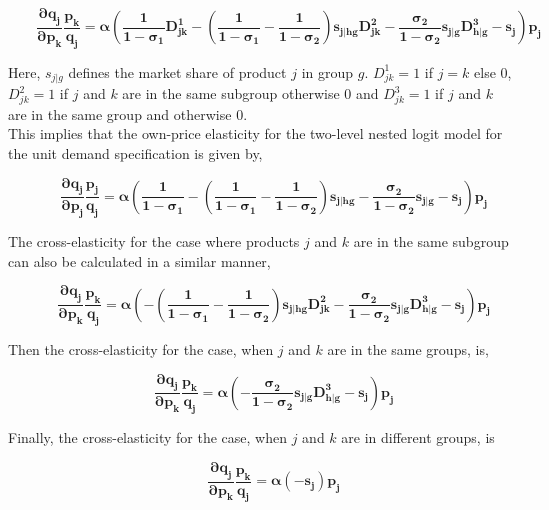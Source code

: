 \documentclass[a4paper,11pt]{article}
\begin{document}
    \begin{equation*}
        \qquad \mathbf{\dfrac{\partial q_{j}}{\partial p_{k}} \dfrac{p_{k}}{q_{j}} = \alpha \left(\dfrac{1}{1-\sigma_{1}}D_{jk}^{1} - \left( \dfrac{1}{1-\sigma_{1}} - \dfrac{1}{1-\sigma_{2}}\right)s_{j|hg}D_{jk}^2 - \dfrac{\sigma_{2}}{1-\sigma_{2}}s_{j|g}D_{h|g}^{3} - s_{j} \right)p_{j}}
    \end{equation*}
    
    Here, $s_{j|g}$ defines the market share of product $j$ in group $g$. $D_{jk}^{1} = 1$ if $j=k$ else $0$, $D_{jk}^{2} = 1$ if $j$ and $k$ are in the same subgroup otherwise $0$ and $D_{jk}^{3} = 1$ if $j$ and $k$ are in the same group and otherwise $0$.\\

    This implies that the own-price elasticity for the two-level nested logit model for the unit demand specification is given by,

    \begin{equation*}
        \qquad \mathbf{\dfrac{\partial q_{j}}{\partial p_{j}} \dfrac{p_{j}}{q_{j}} = \alpha \left(\dfrac{1}{1-\sigma_{1}} - \left( \dfrac{1}{1-\sigma_{1}} - \dfrac{1}{1-\sigma_{2}}\right)s_{j|hg} - \dfrac{\sigma_{2}}{1-\sigma_{2}}s_{j|g} - s_{j} \right)p_{j}}
    \end{equation*}

    The cross-elasticity for the case where products $j$ and $k$ are in the same subgroup can also be calculated in a similar manner,

    \begin{equation*}
        \qquad \mathbf{\dfrac{\partial q_{j}}{\partial p_{k}} \dfrac{p_{k}}{q_{j}} = \alpha \left( - \left( \dfrac{1}{1-\sigma_{1}} - \dfrac{1}{1-\sigma_{2}}\right)s_{j|hg}D_{jk}^2 - \dfrac{\sigma_{2}}{1-\sigma_{2}}s_{j|g}D_{h|g}^{3} - s_{j} \right)p_{j}}
    \end{equation*}

    Then the cross-elasticity for the case, when $j$ and $k$ are in the same groups, is,

    \begin{equation*}
        \qquad \mathbf{\dfrac{\partial q_{j}}{\partial p_{k}} \dfrac{p_{k}}{q_{j}} = \alpha \left( - \dfrac{\sigma_{2}}{1-\sigma_{2}}s_{j|g}D_{h|g}^{3} - s_{j} \right)p_{j}}
    \end{equation*}

    Finally, the cross-elasticity for the case, when $j$ and $k$ are in different groups, is 

    \begin{equation*}
        \qquad \mathbf{\dfrac{\partial q_{j}}{\partial p_{k}} \dfrac{p_{k}}{q_{j}} = \alpha \left( - s_{j} \right)p_{j}}
    \end{equation*}
\end{document}
